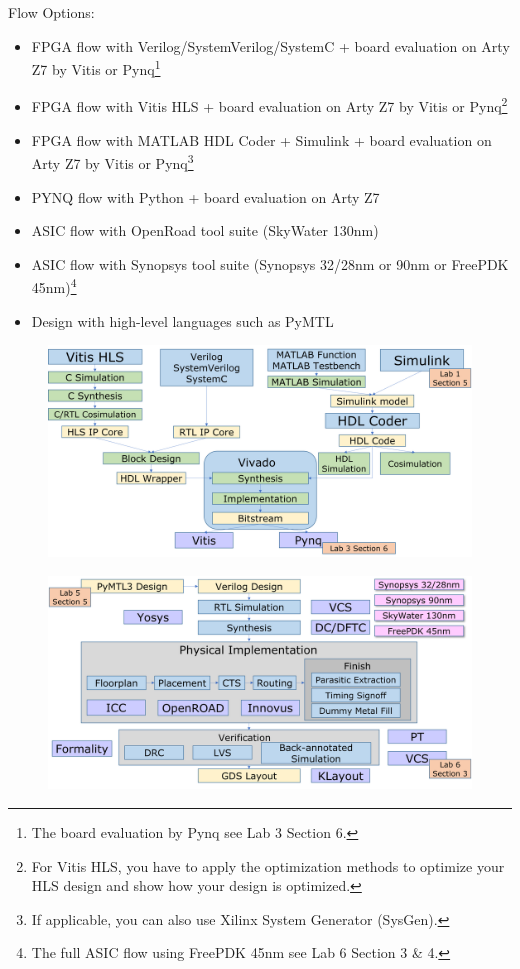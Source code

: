 \documentclass[a4paper,12pt,twoside]{article}
\begin{document}
Flow Options:
\begin{itemize}
    \item FPGA flow with Verilog/SystemVerilog/SystemC + board evaluation on Arty Z7 by Vitis or Pynq\footnote{The board evaluation by Pynq see Lab 3 Section 6.}
    \item FPGA flow with Vitis HLS + board evaluation on Arty Z7 by Vitis or Pynq\footnote{For Vitis HLS, you have to apply the optimization methods to optimize your HLS design and show how your design is optimized.}
    \item FPGA flow with MATLAB HDL Coder + Simulink + board evaluation on Arty Z7 by Vitis or Pynq\footnote{If applicable, you can also use Xilinx System Generator (SysGen).}
    \item PYNQ flow with Python + board evaluation on Arty Z7
    \item ASIC flow with OpenRoad tool suite (SkyWater 130nm)
    \item ASIC flow with Synopsys tool suite (Synopsys 32/28nm or 90nm or FreePDK 45nm)\footnote{The full ASIC flow using FreePDK 45nm see Lab 6 Section 3 \& 4.}
    \item Design with high-level languages such as PyMTL
\end{itemize}
\begin{figure}[H]
    \centering
    \includegraphics[width=\textwidth]{images/23.png}
\end{figure}
\begin{figure}[H]
    \centering
    \includegraphics[width=\textwidth]{images/24.png}
\end{figure}
\end{document}
